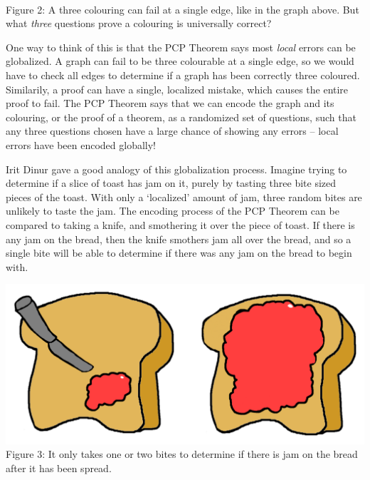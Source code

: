 \documentclass{article}
\theoremstyle{plain}
\theoremstyle{remark}
\theoremstyle{definition}
\begin{document}
\begin{multicols}{2}
\begin{center}
\\
{\small Figure 2: A three colouring can fail at a single edge, like in the graph above. But what {\it three} questions prove a colouring is universally correct?}
\end{center}

 One way to think of this is that the PCP Theorem says most {\it local} errors can be globalized. A graph can fail to be three colourable at a single edge, so we would have to check all edges to determine if a graph has been correctly three coloured. Similarily, a proof can have a single, localized mistake, which causes the entire proof to fail. The PCP Theorem says that we can encode the graph and its colouring, or the proof of a theorem, as a randomized set of questions, such that any three questions chosen have a large chance of showing any errors -- local errors have been encoded globally!

Irit Dinur gave a good analogy of this globalization process. Imagine trying to determine if a slice of toast has jam on it, purely by tasting three bite sized pieces of the toast. With only a `localized' amount of jam, three random bites are unlikely to taste the jam. The encoding process of the PCP Theorem can be compared to taking a knife, and smothering it over the piece of toast. If there is any jam on the bread, then the knife smothers jam all over the bread, and so a single bite will be able to determine if there was any jam on the bread to begin with.

\begin{center}
\includegraphics[scale=0.05]{JamOnToast.png}
\\
{\small Figure 3: It only takes one or two bites to determine if there is jam on the bread after it has been spread.}
\end{center}


\end{multicols}
\end{document}
